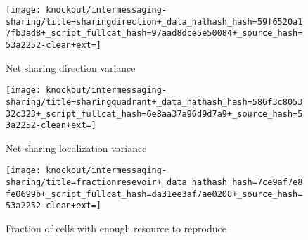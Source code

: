 \begin{figure*}[!htbp]
\begin{center}
\begin{minipage}[t]{\columnwidth}
\end{minipage}%
\begin{minipage}[t]{\columnwidth}

\hspace*{\fill}%
\begin{minipage}[t]{\textwidth}
\centering
\vspace{0pt} %
\begin{subfigure}[b]{\textwidth}
\texttt{[image: knockout/intermessaging-sharing/title=sharingdirection+\_data\_hathash\_hash=59f6520a17fb3ad8+\_script\_fullcat\_hash=97aad8dce5e50084+\_source\_hash=53a2252-clean+ext=]}%
\caption{Net sharing direction variance}
\label{fig:intermessaging-sharing-direction}
\end{subfigure}
\end{minipage}%
\hfill
\begin{minipage}[t]{\textwidth}
\centering
\vspace{0pt} %
\begin{subfigure}[b]{\textwidth}
\texttt{[image: knockout/intermessaging-sharing/title=sharingquadrant+\_data\_hathash\_hash=586f3c805332c323+\_script\_fullcat\_hash=6e8aa37a96d9d7a9+\_source\_hash=53a2252-clean+ext=]}%
\caption{Net sharing localization variance}
\label{fig:intermessaging-sharing-quadrant}
\end{subfigure}
\end{minipage}%
\hfill
\begin{minipage}[t]{\textwidth}
\centering
\vspace{0pt} %
\begin{subfigure}[b]{\textwidth}
\texttt{[image: knockout/intermessaging-sharing/title=fractionresevoir+\_data\_hathash\_hash=7ce9af7e8fe0699b+\_script\_fullcat\_hash=da31ee3af7ae0208+\_source\_hash=53a2252-clean+ext=]}%
\caption{Fraction of cells with enough resource to reproduce}
\label{fig:intermessaging-sharing-resevoir}
\end{subfigure}
\end{minipage}%
\hspace*{\fill}
\end{minipage}


\end{center}
\end{figure*}
